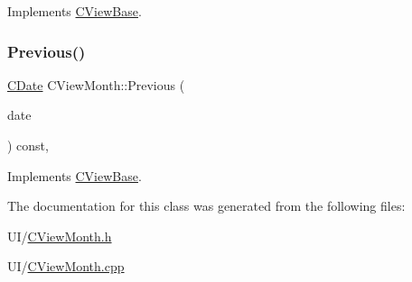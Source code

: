 Implements \mbox{\hyperlink{class_c_view_base_afac2271f0a54dfa083246d4e9c3d0742}{C\+View\+Base}}.

\mbox{\label{class_c_view_month_ad945457c5bf0dbd491facee6a0852714}} 
\subsubsection{\texorpdfstring{Previous()}{Previous()}}
{\footnotesize\ttfamily \mbox{\hyperlink{class_c_date}{C\+Date}} C\+View\+Month\+::\+Previous (\begin{DoxyParamCaption}\item[{const \mbox{\hyperlink{class_c_date}{C\+Date}} \&}]{date }\end{DoxyParamCaption}) const\hspace{0.3cm}{\ttfamily [override]}, {\ttfamily [virtual]}}



Implements \mbox{\hyperlink{class_c_view_base_a9f5365e3225fb1b96058a9f8a599db6b}{C\+View\+Base}}.



The documentation for this class was generated from the following files\+:\begin{DoxyCompactItemize}
\item 
U\+I/\mbox{\hyperlink{_c_view_month_8h}{C\+View\+Month.\+h}}\item 
U\+I/\mbox{\hyperlink{_c_view_month_8cpp}{C\+View\+Month.\+cpp}}\end{DoxyCompactItemize}
